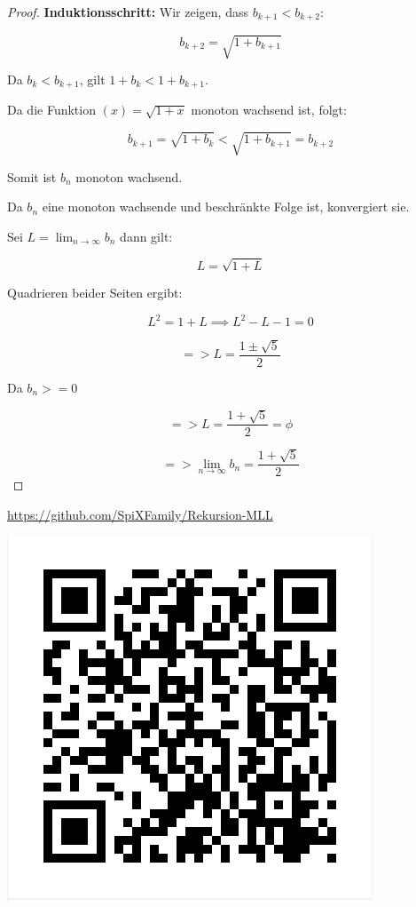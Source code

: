 \documentclass[11pt]{article}
\begin{document}
\begin{proof}
\textbf{Induktionsschritt:} Wir zeigen, dass $b_{k+1} < b_{k+2} :$

$$
b_{k+2} = \sqrt{1 + b_{k+1}}
$$

Da $ b_k < b_{k+1} $, gilt $ 1 + b_k < 1 + b_{k+1} .$ 

Da die Funktion $(x) = \sqrt{1 + x}$ monoton wachsend ist, folgt: 

$$
b_{k+1} = \sqrt{1 + b_k} < \sqrt{1 + b_{k+1}} = b_{k+2}
$$

Somit ist $ b_n $ monoton wachsend.

Da $b_n$ eine monoton wachsende und beschränkte Folge ist, konvergiert sie. 

Sei $L = \lim_{n \to \infty} b_n $ dann gilt:

$$
L = \sqrt{1 + L}
$$

Quadrieren beider Seiten ergibt:

$$
L^2 = 1 + L \implies L^2 - L - 1 = 0
$$


$$
=> L = \frac{1 \pm \sqrt{5}}{2}
$$

Da $ b_n >= 0$ %

$$
=> L = \frac{1 + \sqrt{5}}{2} = \phi
$$



$$
=> \lim_{n \to \infty} b_n = \frac{1 + \sqrt{5}}{2}
$$
\end{proof}
    
    \href{https://github.com/SpiXFamily/Rekursion-MLL}{https://github.com/SpiXFamily/Rekursion-MLL}
  
        \centering
        \includegraphics[width=0.5 \linewidth]{github-qr.png}
  
\end{document}
